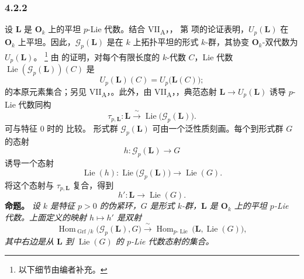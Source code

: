 
\subsubsection*{4.2.2}
\label{sga3:VIIB:4.2.2}
设 \(\mathbf L\) 是 \(\mathbf O_k\) 上的平坦 \(p\)-Lie 代数。结合 VII\textsubscript{A}，， 第\textup{} 项的论证表明，\(U_p(\mathbf L)\) 在 \(\mathbf O_k\) 上平坦。因此，\(\mathscr G_p(\mathbf L)\) 是在 \(k\) 上拓扑平坦的形式 \(k\)-群，其协变 \(\mathbf O_k\)-双代数为 \(U_p(\mathbf L)\)。
\footnote{\label{sga3:VIIB:nde:135}以下细节由编者补充。}
由 \textup{} 的证明，对每个有限长度的 \(k\)-代数 \(C\)，Lie 代数 \(\operatorname{Lie}(\mathscr G_p(\mathbf L))(C)\) 是
\[
  U_p(\mathbf L)(C)
  =
  U_p\bigl(\mathbf L(C)\bigr);
\]
的本原元素集合；另见 VII\textsubscript{A}，。此外，由 VII\textsubscript{A}，，典范态射 \(\mathbf L\to U_p(\mathbf L)\) 诱导 \(p\)-Lie 代数同构
\[
  \tau_{p,\mathbf L}:
  \mathbf L
  \xrightarrow{\ \sim\ }
  \operatorname{Lie}\bigl(\mathscr G_p(\mathbf L)\bigr).
\]
可与特征 \(0\) 时的  比较。
形式群 \(\mathscr G_p(\mathbf L)\) 可由一个泛性质刻画。每个到形式群 \(G\) 的态射
\[
  h:\mathscr G_p(\mathbf L)\longrightarrow G
\]
诱导一个态射
\[
  \operatorname{Lie}(h):
  \operatorname{Lie}\bigl(\mathscr G_p(\mathbf L)\bigr)
  \longrightarrow
  \operatorname{Lie}(G).
\]
将这个态射与 \(\tau_{p,\mathbf L}\) 复合，得到
\[
  h':\mathbf L\longrightarrow\operatorname{Lie}(G).
\]
\medskip
\noindent\textbf{命题。}
\label{sga3:VIIB:4.2.2:universal-property}
{\itshape 设 \(k\) 是特征 \(p>0\) 的伪紧环，\(G\) 是形式 \(k\)-群，\(\mathbf L\) 是 \(\mathbf O_k\) 上的平坦 \(p\)-Lie 代数。上面定义的映射 \(h\mapsto h'\) 是双射
\[
  \operatorname{Hom}_{\operatorname{Grf}/k}
    \bigl(\mathscr G_p(\mathbf L),G\bigr)
  \xrightarrow{\ \sim\ }
  \operatorname{Hom}_{p\text{-}\operatorname{Lie}}
    \bigl(\mathbf L,\operatorname{Lie}(G)\bigr),
\]
其中右边是从 \(\mathbf L\) 到 \(\operatorname{Lie}(G)\) 的 \(p\)-Lie 代数态射的集合。}
